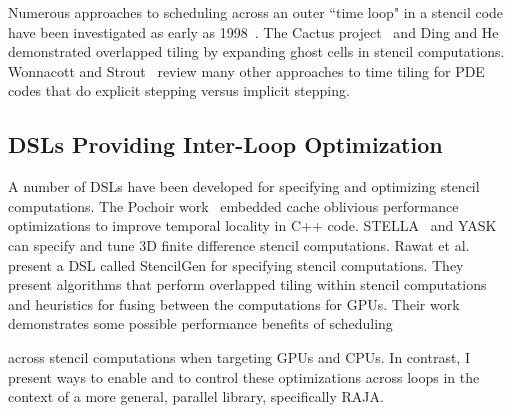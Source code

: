 Numerous approaches to scheduling across an outer ``time loop" in a stencil
code have been investigated as early as 1998~\cite{Bassetti98,Wonnacott00}.  
The Cactus project~\cite{Ripeanu2001,Allen00cactus-gtoolkit} and 
Ding and He~\cite{Ding2001} demonstrated  overlapped tiling by expanding
ghost cells in stencil computations. 
Wonnacott and Strout~\cite{Wonnacott13} review many other approaches to
time tiling for PDE codes that do explicit stepping versus implicit stepping.



\subsection{DSLs Providing Inter-Loop Optimization}
A number of DSLs have been developed for specifying and
optimizing stencil computations.
The Pochoir work~\cite{Tang2011} embedded cache oblivious performance
optimizations to improve temporal locality in C++ code.
STELLA~\cite{Gysi2015}  and YASK~\cite{YASK2016} can specify and 
tune 3D finite difference stencil computations.
Rawat et al.~\cite{Rawat18} present a DSL called StencilGen for specifying
stencil computations.
They present algorithms that perform overlapped tiling within stencil
computations and heuristics for fusing between the computations for GPUs.
Their work demonstrates some possible performance benefits of scheduling

across stencil computations when targeting GPUs and CPUs. In contrast,
I present ways to enable and to control these optimizations across loops
in the context of a more general, parallel library, specifically RAJA.

